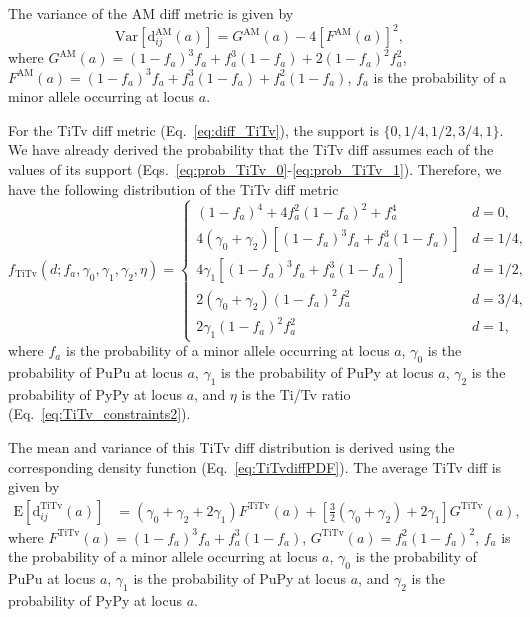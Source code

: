 \documentclass[10pt,letterpaper]{article}
\begin{document}
The variance of the AM diff metric is given by
%
\begin{equation}\label{eq:AMdiffVar}
\text{Var}\left[\text{d}^\text{AM}_{ij}(a)\right] = G^\text{AM}(a) - 4 \left[F^\text{AM}(a)\right]^2,
\end{equation}
%
where $G^\text{AM}(a) = \left(1 - f_a\right)^3 f_a + f^3_a \left(1 - f_a\right) + 2\left(1 - f_a\right)^2 f^2_a$, $F^\text{AM}(a) = \left(1 - f_a\right)^3 f_a + f^3_a \left(1 - f_a\right) + f^2_a \left(1 - f_a\right)$, $f_a$ is the probability of a minor allele occurring at locus $a$.

For the TiTv diff metric (Eq.~\ref{eq:diff_TiTv}), the support is $\{0,1/4,1/2,3/4,1\}$. We have already derived the probability that the TiTv diff assumes each of the values of its support (Eqs.~\ref{eq:prob_TiTv_0}-\ref{eq:prob_TiTv_1}). Therefore, we have the following distribution of the TiTv diff metric
%
\begin{equation}\label{eq:TiTvdiffPDF}
f_\text{TiTv}(d;f_a,\gamma_0,\gamma_1,\gamma_2,\eta) = \begin{cases}
\left(1 - f_a\right)^4 + 4 f^2_a \left(1 - f_a\right)^2 + f^4_a & d=0, \\
4(\gamma_0 + \gamma_2)\left[\left(1 - f_a\right)^3 f_a + f^3_a \left(1 - f_a\right)\right] & d=1/4, \\
4 \gamma_1 \left[\left(1 - f_a\right)^3 f_a + f^3_a \left(1 - f_a\right)\right] & d=1/2, \\
2(\gamma_0 + \gamma_2)\left(1 - f_a\right)^2 f^2_a & d=3/4, \\
2\gamma_1\left(1 - f_a\right)^2 f^2_a & d=1,
\end{cases}
\end{equation}
%
where $f_a$ is the probability of a minor allele occurring at locus $a$, $\gamma_0$ is the probability of PuPu at locus $a$, $\gamma_1$ is the probability of PuPy at locus $a$, $\gamma_2$ is the probability of PyPy at locus $a$, and $\eta$ is the Ti/Tv ratio (Eq.~\ref{eq:TiTv_constraints2}).

The mean and variance of this TiTv diff distribution is derived using the corresponding density function (Eq.~\ref{eq:TiTvdiffPDF}). The average TiTv diff is given by
%
\begin{equation}\label{eq:TiTvdiffMean}
\begin{aligned}
\text{E}\left[\text{d}^\text{TiTv}_{ij}(a)\right] &= (\gamma_0 + \gamma_2 + 2\gamma_1)F^\text{TiTv}(a) + \left[\frac{3}{2}(\gamma_0 + \gamma_2) + 2\gamma_1\right] G^\text{TiTv}(a),
\end{aligned}
\end{equation}
%
where $F^\text{TiTv}(a) = \left(1 - f_a\right)^3 f_a + f^3_a \left(1 - f_a\right)$, $G^\text{TiTv}(a) = f^2_a \left(1 - f_a\right)^2$, $f_a$ is the probability of a minor allele occurring at locus $a$, $\gamma_0$ is the probability of PuPu at locus $a$, $\gamma_1$ is the probability of PuPy at locus $a$, and $\gamma_2$ is the probability of PyPy at locus $a$.
\end{document}
